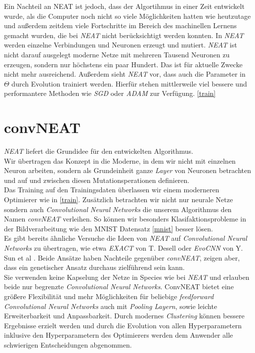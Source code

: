 \documentclass[]{scrartcl}
\begin{document}
			Ein Nachteil an NEAT ist jedoch, dass der Algortihmus in einer Zeit entwickelt wurde, als die Computer noch nicht so viele Möglichkeiten hatten wie heutzutage
			und außerdem zeitdem viele Fortschritte im Bereich des machinellen Lernens gemacht wurden, die bei \textit{NEAT} nicht berücksichtigt werden konnten.
			In \textit{NEAT} werden einzelne Verbindungen und Neuronen erzeugt und mutiert. \textit{NEAT} ist nicht darauf ausgelegt moderne Netze
			mit mehreren Tausend Neuronen zu erzeugen, sondern nur höchstens ein paar Hundert. Das ist für aktuelle Zwecke nicht mehr ausreichend.
			Außerdem sieht \textit{NEAT} vor, dass auch die Parameter in $\Theta$ durch Evolution trainiert werden. Hierfür stehen
			mittlerweile viel bessere und performantere Methoden wie \textit{SGD} oder \textit{ADAM} zur Verfügung. \ref{train}

	\clearpage

	\section{convNEAT}

		\textit{NEAT} liefert die Grundidee für den entwickelten Algorithmus. \\
		Wir übertragen das Konzept in die Moderne, in dem wir nicht mit einzelnen Neuron arbeiten,
		sondern als Grundeinheit ganze \textit{Layer} von Neuronen betrachten und auf und zwischen diesen Mutationsperationen definieren. \\
		Das Training auf den Trainingsdaten überlassen wir einem moderneren Optimierer wie in \ref{train}.
		Zusätzlich betrachten wir nicht nur neurale Netze sondern auch \textit{Convolutional Neural Networks} die unserem Algorithmus den Namen \textit{convNEAT}
		verleihen. So können wir besonders Klasifaktionsprobleme in der Bildverarbeitung wie den MNIST Datensatz \ref{mnist} besser lösen. \\

		Es gibt bereits ähnliche Versuche die Ideen von \textit{NEAT} auf \textit{Convolutional Neural Networks} zu übertragen, wie etwa
		\textit{EXACT} von T. Desell \cite{exact} oder \textit{EvoCNN} von Y. Sun et al \cite{convoneat}.
		Beide Ansätze haben Nachteile gegenüber \textit{convNEAT}, zeigen aber, dass ein genetischer Ansatz durchaus zielführend sein kann. \\
		Sie verwenden keine Kapselung der Netze in Species wie bei \textit{NEAT} und erlauben beide nur begrenzte \textit{Convolutional Neural Networks}.
		ConvNEAT bietet eine größere Flexibilität und mehr Möglichkeiten für beliebige \textit{feedforward Convolutional Neural Networks}
		auch mit \textit{Pooling Layern}, sowie leichte Erweiterbarkeit und Anpassbarkeit. Durch modernes \textit{Clustering} können
		bessere Ergebnisse erzielt werden und durch die Evolution von allen Hyperparametern inklusive den Hyperparametern des Optimierers
		werden dem Anwender alle schwierigen Entscheidungen abgenommen.\\
\end{document}
